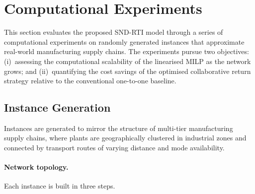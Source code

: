 \section{Computational Experiments}
\label{sec:experiments}

This section evaluates the proposed SND-RTI model through a series of
computational experiments on randomly generated instances that approximate
real-world manufacturing supply chains. The experiments pursue two
objectives: (i)~assessing the computational scalability of the linearised
MILP as the network grows; and (ii)~quantifying the cost savings of the
optimised collaborative return strategy relative to the conventional
one-to-one baseline.


\subsection{Instance Generation}
\label{sec:instance-gen}

Instances are generated to mirror the structure of multi-tier
manufacturing supply chains, where plants are geographically clustered
in industrial zones and connected by transport routes of varying
distance and mode availability.

\paragraph{Network topology.}
Each instance is built in three steps.

